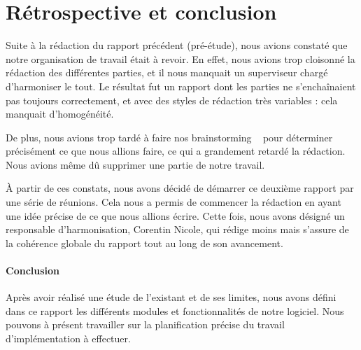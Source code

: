 \section{Rétrospective et conclusion}

	Suite à la rédaction du rapport précédent (pré-étude), nous avions constaté que notre organisation de travail était à revoir. 
	En effet, nous avions trop cloisonné la rédaction des différentes parties, et il nous manquait un superviseur chargé d'harmoniser le tout.
	Le résultat fut un rapport dont les parties ne s'enchaînaient pas toujours correctement, et avec des styles de rédaction très variables : cela manquait d'homogénéité.

	De plus, nous avions trop tardé à faire nos \og brainstorming \fg~ pour déterminer précisément ce que nous allions faire, ce qui a grandement retardé la rédaction. Nous avions même dû supprimer une partie de notre travail.

	À partir de ces constats, nous avons décidé de démarrer ce deuxième rapport par une série de réunions. Cela nous a permis de commencer la rédaction en ayant une idée précise de ce que nous allions écrire.
	Cette fois, nous avons désigné un responsable d'harmonisation, Corentin {\sc Nicole}, qui rédige moins mais s'assure de la cohérence globale du rapport tout au long de son avancement.

	\paragraph{Conclusion} Après avoir réalisé une étude de l'existant et de ses limites, nous avons défini dans ce rapport les différents modules et fonctionnalités de notre logiciel. Nous pouvons à présent travailler sur la planification précise du travail d'implémentation à effectuer. 